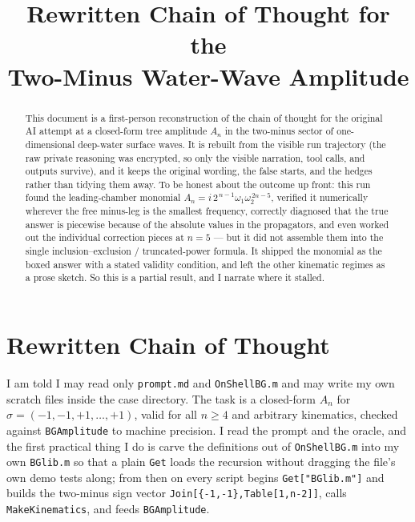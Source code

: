 \documentclass{article}
\title{Rewritten Chain of Thought for the\\
Two-Minus Water-Wave Amplitude}
\author{}
\date{}
\begin{document}
\maketitle

\begin{abstract}
This document is a first-person reconstruction of the chain of thought for the
original AI attempt at a closed-form tree amplitude $A_n$ in the two-minus
sector of one-dimensional deep-water surface waves. It is rebuilt from the
visible run trajectory (the raw private reasoning was encrypted, so only the
visible narration, tool calls, and outputs survive), and it keeps the original
wording, the false starts, and the hedges rather than tidying them away. To be
honest about the outcome up front: this run found the leading-chamber monomial
$A_n=i\,2^{\,n-1}\omega_1\omega_2^{\,2n-5}$, verified it numerically wherever the
free minus-leg is the smallest frequency, correctly diagnosed that the true
answer is piecewise because of the absolute values in the propagators, and even
worked out the individual correction pieces at $n=5$ --- but it did not assemble
them into the single inclusion--exclusion / truncated-power formula. It shipped
the monomial as the boxed answer with a stated validity condition, and left the
other kinematic regimes as a prose sketch. So this is a partial result, and I
narrate where it stalled.
\end{abstract}

\section*{Rewritten Chain of Thought}

I am told I may read only \texttt{prompt.md} and \texttt{OnShellBG.m} and may
write my own scratch files inside the case directory. The task is a closed-form
$A_n$ for $\sigma=(-1,-1,+1,\dots,+1)$, valid for all $n\ge4$ and arbitrary
kinematics, checked against \texttt{BGAmplitude} to machine precision. I read the
prompt and the oracle, and the first practical thing I do is carve the
definitions out of \texttt{OnShellBG.m} into my own \texttt{BGlib.m} so that a
plain \texttt{Get} loads the recursion without dragging the file's own demo tests
along; from then on every script begins \texttt{Get["BGlib.m"]} and builds the
two-minus sign vector \texttt{Join[\{-1,-1\},Table[1,n-2]]}, calls
\texttt{MakeKinematics}, and feeds \texttt{BGAmplitude}.
\end{document}
